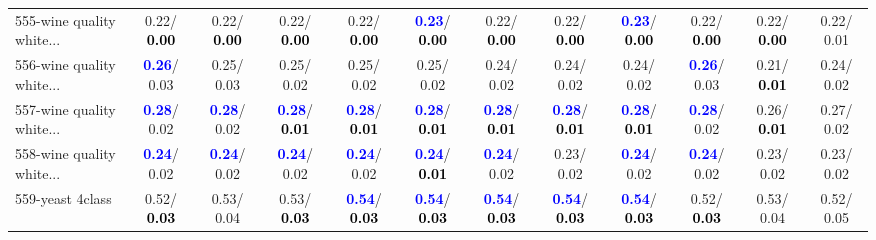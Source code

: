 \begin{table}[h]
\begin{center}
{\begin{tabular}{lc|c|c|c|c|c|c|c|c|c|c}
555-wine quality white... &   0.22/\textcolor{black}{\textbf{  0.00}} &   0.22/\textcolor{black}{\textbf{  0.00}} &   0.22/\textcolor{black}{\textbf{  0.00}} &   0.22/\textcolor{black}{\textbf{  0.00}} & \textcolor{blue}{\textbf{  0.23}}/\textcolor{black}{\textbf{  0.00}} &   0.22/\textcolor{black}{\textbf{  0.00}} &   0.22/\textcolor{black}{\textbf{  0.00}} & \textcolor{blue}{\textbf{  0.23}}/\textcolor{black}{\textbf{  0.00}} &   0.22/\textcolor{black}{\textbf{  0.00}} &   0.22/\textcolor{black}{\textbf{  0.00}} &   0.22/  0.01 \\
556-wine quality white... & \textcolor{blue}{\textbf{  0.26}}/  0.03 &   0.25/  0.03 &   0.25/  0.02 &   0.25/  0.02 &   0.25/  0.02 &   0.24/  0.02 &   0.24/  0.02 &   0.24/  0.02 & \textcolor{blue}{\textbf{  0.26}}/  0.03 &   0.21/\textcolor{black}{\textbf{  0.01}} &   0.24/  0.02 \\
557-wine quality white... & \textcolor{blue}{\textbf{  0.28}}/  0.02 & \textcolor{blue}{\textbf{  0.28}}/  0.02 & \textcolor{blue}{\textbf{  0.28}}/\textcolor{black}{\textbf{  0.01}} & \textcolor{blue}{\textbf{  0.28}}/\textcolor{black}{\textbf{  0.01}} & \textcolor{blue}{\textbf{  0.28}}/\textcolor{black}{\textbf{  0.01}} & \textcolor{blue}{\textbf{  0.28}}/\textcolor{black}{\textbf{  0.01}} & \textcolor{blue}{\textbf{  0.28}}/\textcolor{black}{\textbf{  0.01}} & \textcolor{blue}{\textbf{  0.28}}/\textcolor{black}{\textbf{  0.01}} & \textcolor{blue}{\textbf{  0.28}}/  0.02 &   0.26/\textcolor{black}{\textbf{  0.01}} &   0.27/  0.02 \\
558-wine quality white... & \textcolor{blue}{\textbf{  0.24}}/  0.02 & \textcolor{blue}{\textbf{  0.24}}/  0.02 & \textcolor{blue}{\textbf{  0.24}}/  0.02 & \textcolor{blue}{\textbf{  0.24}}/  0.02 & \textcolor{blue}{\textbf{  0.24}}/\textcolor{black}{\textbf{  0.01}} & \textcolor{blue}{\textbf{  0.24}}/  0.02 &   0.23/  0.02 & \textcolor{blue}{\textbf{  0.24}}/  0.02 & \textcolor{blue}{\textbf{  0.24}}/  0.02 &   0.23/  0.02 &   0.23/  0.02 \\ \hline
559-yeast 4class &   0.52/\textcolor{black}{\textbf{  0.03}} &   0.53/  0.04 &   0.53/\textcolor{black}{\textbf{  0.03}} & \textcolor{blue}{\textbf{  0.54}}/\textcolor{black}{\textbf{  0.03}} & \textcolor{blue}{\textbf{  0.54}}/\textcolor{black}{\textbf{  0.03}} & \textcolor{blue}{\textbf{  0.54}}/\textcolor{black}{\textbf{  0.03}} & \textcolor{blue}{\textbf{  0.54}}/\textcolor{black}{\textbf{  0.03}} & \textcolor{blue}{\textbf{  0.54}}/\textcolor{black}{\textbf{  0.03}} &   0.52/\textcolor{black}{\textbf{  0.03}} &   0.53/  0.04 &   0.52/  0.05 \\

\end{tabular}}
\end{center}
\end{table}
